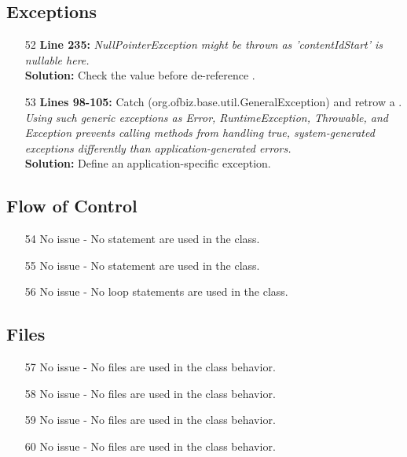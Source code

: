 \subsection{Exceptions}
\begin{itemize}

\item[52] \textbf{Line 235:} 
	\textit{NullPointerException might be thrown as 'contentIdStart' is nullable here.}\\
	\textbf{Solution: }Check the  value before de-reference .
\item[53]  \textbf{Lines 98-105:}
	Catch  (org.ofbiz.base.util.GeneralException) and retrow a .\\
	\textit{Using such generic exceptions as Error, RuntimeException, Throwable, and Exception prevents calling methods from handling true, system-generated exceptions differently than application-generated errors.}\\
	\textbf{Solution:} Define an application-specific exception.
\end{itemize}

\subsection{Flow of Control}
\begin{itemize}
	\item[54] No issue - No  statement are used in the class.
	\item[55] No issue - No  statement are used in the class.
	\item[56] No issue - No loop statements are used in the class.
\end{itemize}

\subsection{Files}
\begin{itemize}
	\item[57] No issue - No files are used in the class behavior.
	\item[58] No issue - No files are used in the class behavior.
	\item[59] No issue - No files are used in the class behavior.
	\item[60] No issue - No files are used in the class behavior.
\end{itemize}
